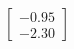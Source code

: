 \documentclass[preview]{standalone}
\begin{document}
\begin{align*}
\begin{bmatrix} -0.95 \\ -2.30 \end{bmatrix}
\end{align*}
\end{document}
